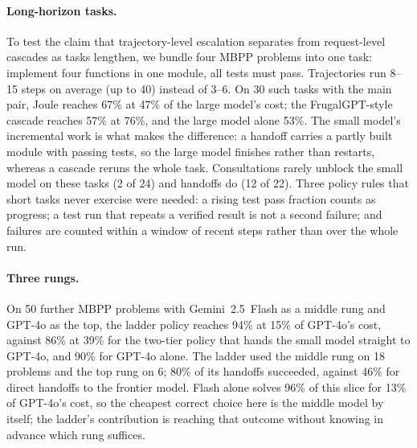 \paragraph{Long-horizon tasks.}
To test the claim that trajectory-level escalation separates from request-level cascades as tasks lengthen, we bundle four MBPP problems into one task: implement four functions in one module, all tests must pass.
Trajectories run 8--15 steps on average (up to 40) instead of 3--6.
On 30 such tasks with the main pair, Joule reaches 67\% at 47\% of the large model's cost; the FrugalGPT-style cascade reaches 57\% at 76\%, and the large model alone 53\%.
The small model's incremental work is what makes the difference: a handoff carries a partly built module with passing tests, so the large model finishes rather than restarts, whereas a cascade reruns the whole task.
Consultations rarely unblock the small model on these tasks (2 of 24) and handoffs do (12 of 22).
Three policy rules that short tasks never exercise were needed: a rising test pass fraction counts as progress; a test run that repeats a verified result is not a second failure; and failures are counted within a window of recent steps rather than over the whole run.

\paragraph{Three rungs.}
On 50 further MBPP problems with Gemini~2.5~Flash as a middle rung and GPT-4o as the top, the ladder policy reaches 94\% at 15\% of GPT-4o's cost, against 86\% at 39\% for the two-tier policy that hands the small model straight to GPT-4o, and 90\% for GPT-4o alone.
The ladder used the middle rung on 18 problems and the top rung on 6; 80\% of its handoffs succeeded, against 46\% for direct handoffs to the frontier model.
Flash alone solves 96\% of this slice for 13\% of GPT-4o's cost, so the cheapest correct choice here is the middle model by itself; the ladder's contribution is reaching that outcome without knowing in advance which rung suffices.

